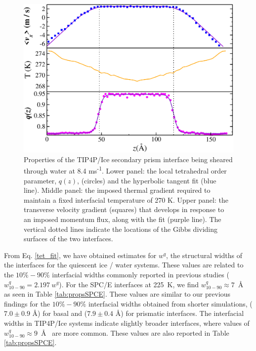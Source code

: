 \begin{figure}[H]
\includegraphics[width=\linewidth]{Figures/SecPrism_TIP4PIce_Plot}
\caption{\label{fig:tipsComic} Properties of the TIP4P/Ice secondary prism
  interface being sheared through water at 8.4
  ms\textsuperscript{-1}. Lower panel: the local tetrahedral order
  parameter, $q(z)$, (circles) and the hyperbolic tangent fit
  (blue line).  Middle panel: the imposed thermal gradient
  required to maintain a fixed interfacial temperature of 270 K. Upper
  panel: the transverse velocity gradient (squares) that develops in
  response to an imposed momentum flux, along with the fit (purple
  line). The vertical dotted lines indicate the locations of the Gibbs
  dividing surfaces of the two interfaces.}
\end{figure}

From Eq. \eqref{tet_fit}, we have obtained estimates for $w^{q}$, the
structural widths of the interfaces for the quiescent ice / water
systems. These values are related to the $10\%-90\%$ interfacial
widths commonly reported in previous studies
($w_\mathrm{10-90}^{q} = 2.197~w^{q}$).\cite{Bryk2002,Bryk2004} For the
SPC/E interfaces at 225~K, we find
$w_\mathrm{10-90}^{q} \approx 7$~\AA~ as seen in Table
\ref{tab:propsSPCE}. These values are similar to our previous findings
for the $10\%-90\%$ interfacial widths obtained from shorter
simulations, ($7.0 \pm 0.9$ \AA) for basal and ($7.9 \pm 0.4$ \AA) for
prismatic interfaces.\cite{Louden2013a} The interfacial widths in
TIP4P/Ice systems indicate slightly broader interfaces, where values
of $w_\mathrm{10-90}^{q} \approx 9$~\AA~ are more common. These values
are also reported in Table \ref{tab:propsSPCE}.


